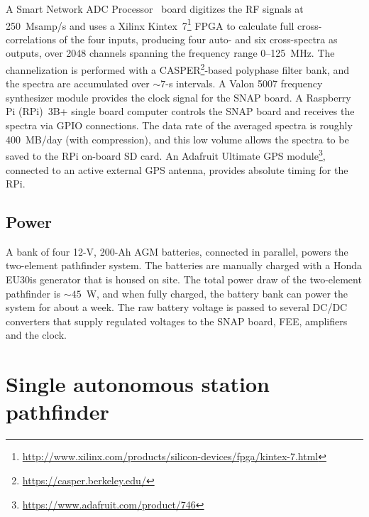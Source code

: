 \documentclass{ws-jai}
\begin{document}
A Smart Network ADC Processor~\citep[SNAP;][]{2016JAI.....541001H}
board digitizes the RF signals at 250~Msamp/s and uses a Xilinx
Kintex~7\footnote{\url{http://www.xilinx.com/products/silicon-devices/fpga/kintex-7.html}}
FPGA to calculate full cross-correlations of the four inputs,
producing four auto- and six cross-spectra as outputs, over 2048
channels spanning the frequency range 0--125~MHz.  The channelization
is performed with a
CASPER\footnote{\url{https://casper.berkeley.edu/}}-based polyphase
filter bank, and the spectra are accumulated over $\sim7$-s intervals.
A Valon 5007 frequency synthesizer module provides the clock signal
for the SNAP board.  A Raspberry Pi (RPi)~3B+ single board computer
controls the SNAP board and receives the spectra via GPIO connections.
The data rate of the averaged spectra is roughly 400~MB/day (with
compression), and this low volume allows the spectra to be saved to
the RPi on-board SD card.  An Adafruit Ultimate GPS
module\footnote{\url{https://www.adafruit.com/product/746}}, connected
to an active external GPS antenna, provides absolute timing for the
RPi.


\subsection{Power}

A bank of four 12-V, 200-Ah AGM batteries, connected in parallel,
powers the two-element pathfinder system.  The batteries are manually
charged with a Honda EU30is generator that is housed on site.  The
total power draw of the two-element pathfinder is $\sim45$~W, and when
fully charged, the battery bank can power the system for about a week.
The raw battery voltage is passed to several DC/DC converters that
supply regulated voltages to the SNAP board, FEE, amplifiers and the
clock.


\section{Single autonomous station pathfinder}
\end{document}
